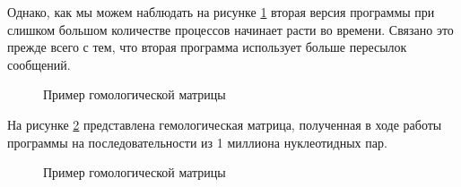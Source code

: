 Однако, как мы можем наблюдать на рисунке \ref{img:a5} вторая версия программы
при слишком большом количестве процессов начинает расти во времени. Связано это прежде всего с тем, что вторая программа
использует больше пересылок сообщений.
\begin{figure}[h]
\caption{Пример гомологической матрицы}
\label{img:a5}  
\end{figure}

На рисунке \ref{img:a6} представлена гемологическая матрица, полученная в ходе
работы программы на последовательности из 1 миллиона нуклеотидных пар.
\begin{figure}[h]
\caption{Пример гомологической матрицы}
\label{img:a6}  
\end{figure}


\clearpage
